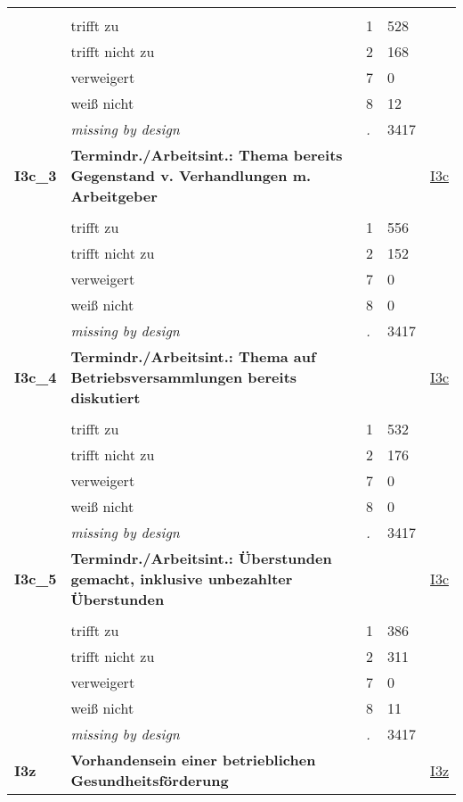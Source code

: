 \begin{longtable}{| L{2.65cm} | L{8cm} | C{1.5cm} | R{1.25cm} | C{2.25cm}  |}
   &  &  &  &  \\ 
   & trifft zu & 1 & 528 &  \\ 
   & trifft nicht zu & 2 & 168 &  \\ 
   & verweigert & 7 & 0 &  \\ 
   & weiß nicht & 8 & 12 &  \\ 
   & \textit{missing by design} & \textit{.} & 3417 &  \\ 
   \midrule
\textbf{I3c\_3}\label{var:I3c:3} & \textbf{Termindr./Arbeitsint.: Thema bereits Gegenstand v. Verhandlungen m. Arbeitgeber} &  &  & \hyperref[I3c]{I3c} \\ 
   &  &  &  &  \\ 
   & trifft zu & 1 & 556 &  \\ 
   & trifft nicht zu & 2 & 152 &  \\ 
   & verweigert & 7 & 0 &  \\ 
   & weiß nicht & 8 & 0 &  \\ 
   & \textit{missing by design} & \textit{.} & 3417 &  \\ 
   \midrule
\textbf{I3c\_4}\label{var:I3c:4} & \textbf{Termindr./Arbeitsint.: Thema auf Betriebsversammlungen bereits diskutiert} &  &  & \hyperref[I3c]{I3c} \\ 
   &  &  &  &  \\ 
   & trifft zu & 1 & 532 &  \\ 
   & trifft nicht zu & 2 & 176 &  \\ 
   & verweigert & 7 & 0 &  \\ 
   & weiß nicht & 8 & 0 &  \\ 
   & \textit{missing by design} & \textit{.} & 3417 &  \\ 
   \midrule
\textbf{I3c\_5}\label{var:I3c:5} & \textbf{Termindr./Arbeitsint.: Überstunden gemacht, inklusive unbezahlter Überstunden} &  &  & \hyperref[I3c]{I3c} \\ 
   &  &  &  &  \\ 
   & trifft zu & 1 & 386 &  \\ 
   & trifft nicht zu & 2 & 311 &  \\ 
   & verweigert & 7 & 0 &  \\ 
   & weiß nicht & 8 & 11 &  \\ 
   & \textit{missing by design} & \textit{.} & 3417 &  \\ 
   \midrule
\textbf{I3z}\label{var:I3z} & \textbf{Vorhandensein einer betrieblichen Gesundheitsförderung} &  &  & \hyperref[I3z]{I3z} \\ 

\end{longtable}
